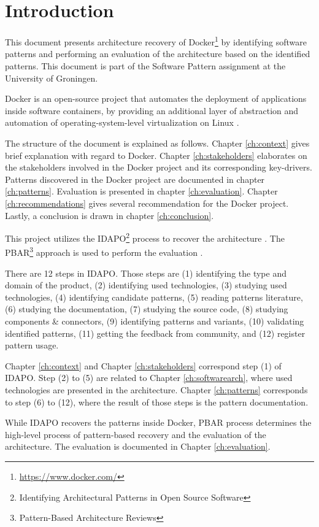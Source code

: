 \clearpage
\chapter{Introduction}
\label{ch:introduction}
This document presents architecture recovery of
Docker\footnote{\url{https://www.docker.com/}} by identifying software patterns
and performing an evaluation of the architecture based on the identified
patterns. This document is part of the Software Pattern assignment at the
University of Groningen.

Docker is an open-source project that automates the deployment of applications
inside software containers, by providing an additional layer of abstraction and
automation of operating-system-level virtualization on Linux \cite{dockerdef}.

The structure of the document is explained as follows. Chapter \ref{ch:context}
gives brief explanation with regard to Docker. Chapter \ref{ch:stakeholders}
elaborates on the stakeholders involved in the Docker project and its
corresponding key-drivers. Patterns discovered in the Docker project are
documented in chapter \ref{ch:patterns}. Evaluation is presented in chapter
\ref{ch:evaluation}. Chapter \ref{ch:recommendations} gives several
recommendation for the Docker project. Lastly, a conclusion is drawn in chapter
\ref{ch:conclusion}.

This project utilizes the IDAPO\footnote{Identifying Architectural Patterns in
Open Source Software} process to recover the architecture \cite{idapo}. The
PBAR\footnote{Pattern-Based Architecture Reviews} approach is used to perform
the evaluation \cite{pbar}.

There are 12 steps in IDAPO. Those steps are (1) identifying the type and domain
of the product, (2) identifying used technologies, (3) studying used
technologies, (4) identifying candidate patterns, (5) reading patterns
literature, (6) studying the documentation, (7) studying the source code, (8)
studying components \& connectors, (9) identifying patterns and variants, (10)
validating identified patterns, (11) getting the feedback from community, and
(12) register pattern usage.

Chapter \ref{ch:context} and Chapter \ref{ch:stakeholders} correspond step (1)
of IDAPO. Step (2) to (5) are related to Chapter \ref{ch:softwarearch}, where
used technologies are presented in the architecture. Chapter \ref{ch:patterns}
corresponds to step (6) to (12), where the result of those steps is the pattern
documentation.

While IDAPO recovers the patterns inside Docker, PBAR process determines the
high-level process of pattern-based recovery and the evaluation of the
architecture. The evaluation is documented in Chapter \ref{ch:evaluation}.
